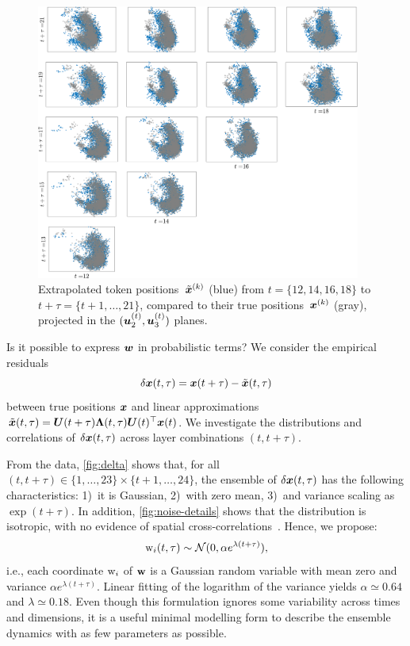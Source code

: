 \documentclass{article} %
\begin{document}
\begin{figure}[ht]
\begin{center}
\includegraphics[width=0.95\textwidth]{fig/fig-extrapolation-v07.png}
\end{center}
\caption{
Extrapolated token positions~$\Tilde{{\bm{x}}}^{(k)}$ (blue) from $t = \{ 12,14,16,18\}$ to $t+\tau = \{ t+1,\dots,21\}$, compared to their true positions~${\bm{x}}^{(k)}$ (gray), projected in the $( {\bm{u}}_2^{(t)},{\bm{u}}_3^{(t)})$ planes.
}
\label{fig:extrapolation}
\end{figure}

Is it possible to express ${\bm{w}}$ in probabilistic terms?
We consider the empirical residuals 
\[
\delta {\bm{x}}(t,\tau) = {\bm{x}}(t+\tau) - \Tilde{{\bm{x}}}(t,\tau) 
\]
between true positions ${\bm{x}}$ and linear approximations $\Tilde{{\bm{x}}}(t,\tau) = {\bm{U}}(t+\tau) \mathbf{\Lambda}(t,\tau) {\bm{U}}(t)^{\top} {\bm{x}}(t)$. 
We investigate the distributions and correlations of $\delta {\bm{x}}(t,\tau)$ across layer combinations $(t,t+\tau)$.

From the data, \cref{fig:delta} shows that, for all $(t,t+\tau) \in \{ 1, \dots, 23 \} \times \{ t+1, \dots, 24 \}$, the ensemble of $\delta {\bm{x}}(t,\tau)$ has the following characteristics: 1)~it is Gaussian, 2)~with zero mean, 3)~and variance scaling as $\exp(t+\tau)$.
In addition, \cref{fig:noise-details} shows that the distribution is isotropic, with no evidence of spatial cross-correlations~. Hence, we propose:
\begin{equation} \label{eq:noise}
    {\textnormal{w}}_i (t,\tau) \sim \mathcal{N}(0, \alpha e^{\lambda (t+\tau)}),
\end{equation}
i.e., each coordinate ${\textnormal{w}}_i$ of ${\mathbf{w}}$ is a Gaussian random variable with mean zero and variance $\alpha e^{\lambda(t+\tau)}$.
Linear fitting of the logarithm of the variance yields $\alpha \simeq 0.64$ and $\lambda \simeq 0.18$.
Even though this formulation ignores some variability across times and dimensions, it is a useful minimal modelling form to describe the ensemble dynamics with as few parameters as possible.
\end{document}
